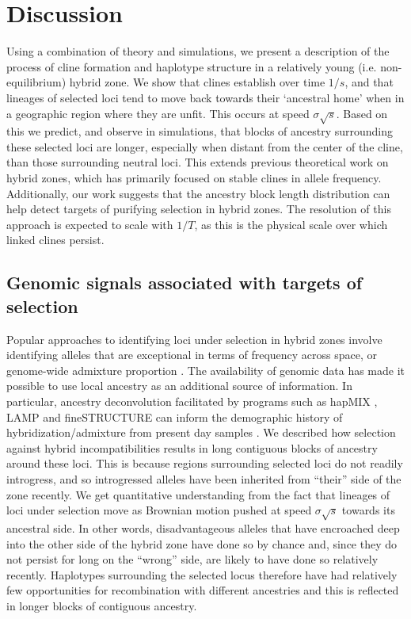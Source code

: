 \documentclass[11pt,letterpaper]{article}
\begin{document}
\section*{Discussion}

Using a combination of theory and simulations, we present a description of the process of cline formation and haplotype structure in a relatively young (i.e. non-equilibrium) hybrid zone.
We show that clines establish over time $1/s$, and that lineages of selected loci tend to move back towards their `ancestral home' when in a geographic region where they  are unfit. 
This occurs at speed $\sigma\sqrt{s}$. Based on this we predict, and observe in simulations, that blocks of ancestry surrounding these selected loci are longer, especially when distant from the center of the cline, than those surrounding neutral loci. 
This extends previous theoretical work on hybrid zones, which has primarily focused on stable clines in allele frequency. 
Additionally, our work suggests that the ancestry block length distribution can help detect targets of purifying selection in hybrid zones.  
The resolution of this approach is expected to scale with $1/T$, as this is the physical scale over which linked clines persist.  

\subsection*{Genomic signals associated with targets of selection}

Popular approaches to identifying loci under selection in hybrid zones 
involve identifying alleles that are exceptional in terms of frequency across space, or genome-wide admixture proportion \citep{Porter1997,Gompert2012}.  
The availability of genomic data has made it possible to use local ancestry as an additional source of information. 
In particular, ancestry deconvolution facilitated by programs such as  hapMIX \citep{Price2009}, LAMP \citep{Sankararaman2008} and fineSTRUCTURE \citep{Lawson2012} 
can inform the demographic history of hybridization/admixture from present day samples \citep[e.g. ][]{Hellenthal2014}. 
We described how selection against hybrid incompatibilities  
results in long contiguous blocks of ancestry around these loci. 
This is because regions surrounding selected loci do not readily introgress, 
and so introgressed alleles have been inherited from ``their'' side of the zone recently. %
We get quantitative understanding from the fact that lineages of
loci under selection move as Brownian motion pushed at speed $\sigma \sqrt{s}$ towards its ancestral side.
In other words, disadvantageous alleles that have encroached deep into the other side of the hybrid zone have done so by chance and, since they do not persist for long on the ``wrong'' side, are likely to have done so relatively recently. Haplotypes surrounding the selected locus therefore have had relatively few opportunities for recombination with different ancestries and this is reflected in longer blocks of contiguous ancestry.
\end{document}

